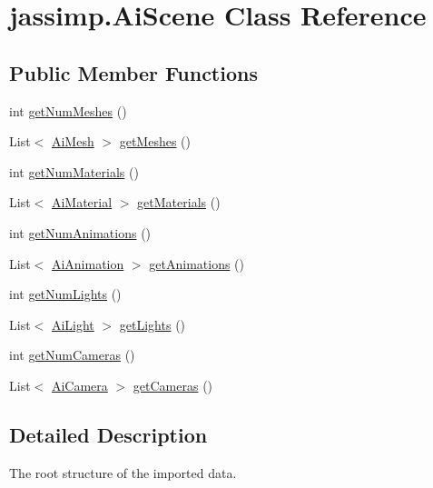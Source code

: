 \hypertarget{classjassimp_1_1_ai_scene}{\section{jassimp.\+Ai\+Scene Class Reference}
\label{classjassimp_1_1_ai_scene}
}
\subsection*{Public Member Functions}
\begin{DoxyCompactItemize}
\item 
int \hyperlink{classjassimp_1_1_ai_scene_aab2472bb09d0a16b8ca69d37ad71e15c}{get\+Num\+Meshes} ()
\item 
List$<$ \hyperlink{classjassimp_1_1_ai_mesh}{Ai\+Mesh} $>$ \hyperlink{classjassimp_1_1_ai_scene_a793914ca0bd21c9dc90d159181f5b75b}{get\+Meshes} ()
\item 
int \hyperlink{classjassimp_1_1_ai_scene_a8839b9e434a7d6c07c580733a3d272e0}{get\+Num\+Materials} ()
\item 
List$<$ \hyperlink{classjassimp_1_1_ai_material}{Ai\+Material} $>$ \hyperlink{classjassimp_1_1_ai_scene_afcce607777d9f56b57403e3d3a9d3cb6}{get\+Materials} ()
\item 
int \hyperlink{classjassimp_1_1_ai_scene_abb3362b879534b96418c20a4e08008b5}{get\+Num\+Animations} ()
\item 
List$<$ \hyperlink{classjassimp_1_1_ai_animation}{Ai\+Animation} $>$ \hyperlink{classjassimp_1_1_ai_scene_adb3a91f1a012675933c12a7088670b30}{get\+Animations} ()
\item 
int \hyperlink{classjassimp_1_1_ai_scene_ab72c811b0737aad744b5253a37ff98c0}{get\+Num\+Lights} ()
\item 
List$<$ \hyperlink{classjassimp_1_1_ai_light}{Ai\+Light} $>$ \hyperlink{classjassimp_1_1_ai_scene_a988d49999e568625f9ed758561d057d3}{get\+Lights} ()
\item 
int \hyperlink{classjassimp_1_1_ai_scene_ab2b9df17be88cfb6dea66493464b2ee3}{get\+Num\+Cameras} ()
\item 
List$<$ \hyperlink{classjassimp_1_1_ai_camera}{Ai\+Camera} $>$ \hyperlink{classjassimp_1_1_ai_scene_ad9f33ee3346aef48f8796e0192224fdf}{get\+Cameras} ()
\end{DoxyCompactItemize}


\subsection{Detailed Description}
The root structure of the imported data.


